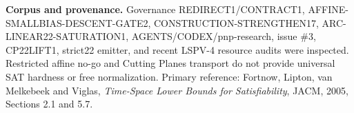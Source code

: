\documentclass{article}
\begin{document}
\noindent\textbf{Corpus and provenance.}
Governance REDIRECT1/CONTRACT1, AFFINE-SMALLBIAS-DESCENT-GATE2, CONSTRUCTION-STRENGTHEN17, ARC-LINEAR22-SATURATION1, AGENTS/CODEX/pnp-research, issue \#3, CP22LIFT1, strict22 emitter, and recent LSPV-4 resource audits were inspected. Restricted affine no-go and Cutting Planes transport do not provide universal SAT hardness or free normalization. Primary reference: Fortnow, Lipton, van Melkebeek and Viglas, \emph{Time-Space Lower Bounds for Satisfiability}, JACM, 2005, Sections 2.1 and 5.7.
\end{document}
